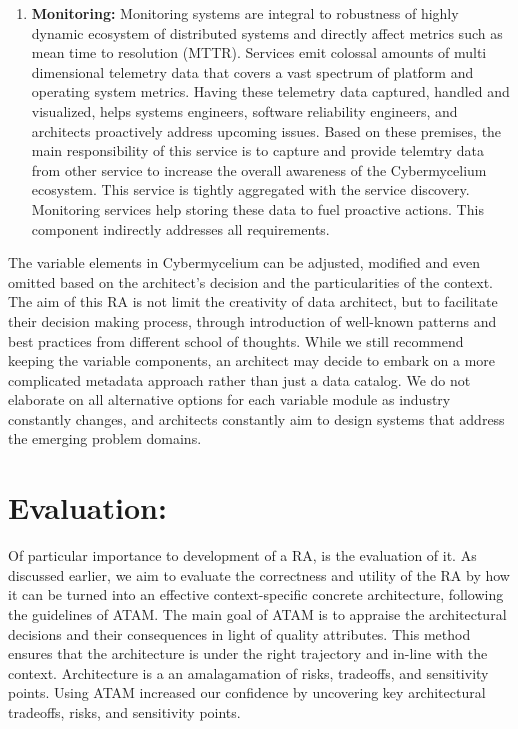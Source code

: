 \documentclass[review]{elsarticle}
\begin{document}
\begin{enumerate}
    \item \textbf{Monitoring:} Monitoring systems are integral to robustness of highly dynamic ecosystem of distributed systems and directly affect metrics such as mean time to resolution (MTTR). Services emit colossal amounts of multi dimensional telemetry data that covers a vast spectrum of platform and operating system metrics. Having these telemetry data captured, handled and visualized, helps systems engineers, software reliability engineers, and architects proactively address upcoming issues. Based on these premises, the main responsibility of this service is to capture and provide telemtry data from other service to increase the overall awareness of the Cybermycelium ecosystem. This service is tightly aggregated with the service discovery. Monitoring services help storing
    these data to fuel proactive actions. This component
    indirectly addresses all requirements.

\end{enumerate}

The variable elements in Cybermycelium can be adjusted, modified and even omitted based on the architect's decision and the particularities of the context. The aim of this RA is not limit the creativity of data architect, but to facilitate their decision making process, through introduction of well-known patterns and best practices from different school of thoughts. While we still recommend keeping the variable components, an architect may decide to embark on a more complicated metadata approach rather than just a data catalog. We do not elaborate on all alternative options for each variable module as industry constantly changes, and architects constantly aim to design systems that address the emerging problem domains. 


\section{Evaluation:} \label{evaluation-section}

Of particular importance to development of a RA, is the evaluation of it. As discussed earlier, we aim to evaluate the correctness and utility of the RA by how it can be turned into an effective context-specific concrete architecture, following the guidelines of ATAM. The main goal of ATAM is to appraise the architectural decisions and their consequences in light of quality attributes. This method ensures that the architecture is under the right trajectory and in-line with the context. Architecture is a an amalagamation of risks, tradeoffs, and sensitivity points. Using ATAM increased our confidence by uncovering key architectural tradeoffs, risks, and sensitivity points.
\end{document}
